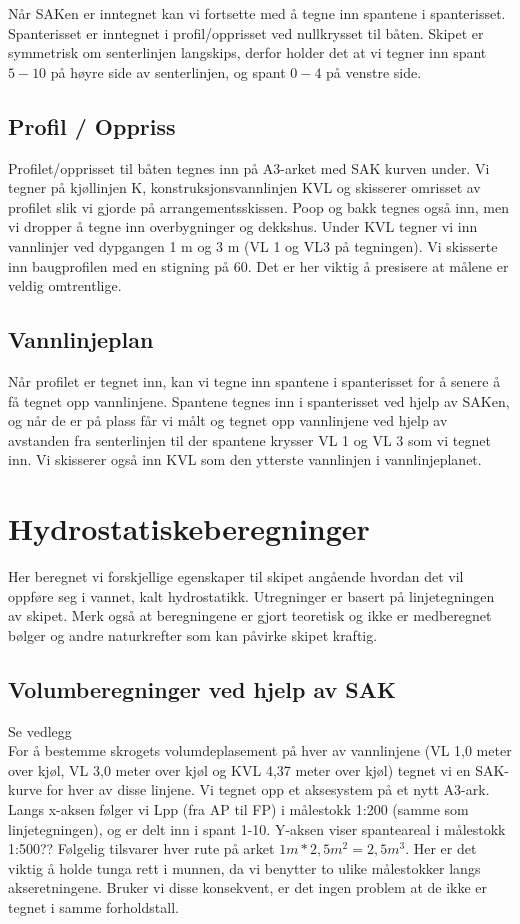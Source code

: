 \documentclass[norsk]{article}
\begin{document}
Når SAKen er inntegnet kan vi fortsette med å tegne inn spantene i spanterisset. Spanterisset er inntegnet i profil/opprisset ved nullkrysset til båten. Skipet er symmetrisk om senterlinjen langskips, derfor holder det at vi tegner inn spant $5-10$ på høyre side av senterlinjen, og spant $0-4$ på venstre side. \\

	\subsection{Profil / Oppriss}
Profilet/opprisset til båten tegnes inn på A3-arket med SAK kurven under. Vi tegner på kjøllinjen K, konstruksjonsvannlinjen KVL og skisserer omrisset av profilet slik vi gjorde på arrangementsskissen. Poop og bakk tegnes også inn, men vi dropper å tegne inn overbygninger og dekkshus. Under KVL tegner vi inn vannlinjer ved dypgangen 1 m og 3 m (VL 1 og VL3 på tegningen). Vi skisserte inn baugprofilen med en stigning på 60\degree. Det er her viktig å presisere at målene er veldig omtrentlige.\\

 	\subsection{Vannlinjeplan}
Når profilet er tegnet inn, kan vi tegne inn spantene i spanterisset for å senere å få tegnet opp vannlinjene. Spantene tegnes inn i spanterisset ved hjelp av SAKen, og når de er på plass får vi målt og tegnet opp vannlinjene ved hjelp av avstanden fra senterlinjen til der spantene krysser VL 1 og VL 3 som vi tegnet inn. Vi skisserer også inn KVL som den ytterste vannlinjen i vannlinjeplanet. \\
\section{Hydrostatiskeberegninger}
Her beregnet vi forskjellige egenskaper til skipet angående hvordan det vil oppføre seg i vannet, kalt hydrostatikk. Utregninger er basert på linjetegningen av skipet. Merk også at beregningene er gjort teoretisk og ikke er medberegnet bølger og andre naturkrefter som kan påvirke skipet kraftig.
	\subsection{Volumberegninger ved hjelp av SAK}
Se vedlegg\\
For å bestemme skrogets volumdeplasement på hver av vannlinjene (VL 1,0 meter over kjøl, VL 3,0 meter over kjøl og KVL 4,37 meter over kjøl) tegnet vi en SAK-kurve for hver av disse linjene. Vi tegnet opp et aksesystem på et nytt A3-ark. Langs x-aksen følger vi Lpp (fra AP til FP) i målestokk 1:200 (samme som linjetegningen), og er delt inn i spant 1-10. Y-aksen viser spanteareal i målestokk 1:500?? Følgelig tilsvarer hver rute på arket $1m*2,5m^2 = 2,5m^3$. Her er det viktig å holde tunga rett i munnen, da vi benytter to ulike målestokker langs akseretningene. Bruker vi disse konsekvent, er det ingen problem at de ikke er tegnet i samme forholdstall. \\
\end{document}
